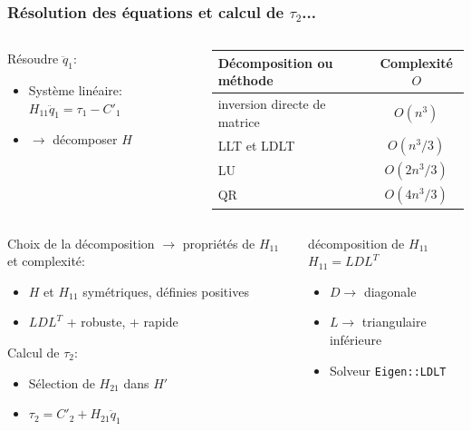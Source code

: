 \documentclass[10pt]{beamer}
\begin{document}
\begin{frame}[allowframebreaks]
  \frametitle{Résolution des équations et calcul de $\tau_2$...}
  
  \begin{columns}[T]
	\begin{column}{0.5\textwidth}
		Résoudre $\ddot{q}_1$:
		\begin{itemize}
		\item Système linéaire: $H_{11} \ddot{q}_1 = \tau_1 - C'_1$
		\item $\rightarrow$ décomposer $H$
		\end{itemize}
  \end{column}
	\begin{column}{0.5\textwidth}\scriptsize
		\begin{tabular}[H]{|l|c|}
		\hline
		Décomposition ou méthode & Complexité $O$ \\ \hline \hline
		inversion directe de matrice & $O(n^3)$ \\ \hline
		LLT et LDLT & $O(n^3/3)$ \\ \hline
		LU & $O(2n^3/3)$ \\ \hline
		QR & $O(4n^3/3)$ \\
		\hline
		\end{tabular}
	\end{column}
	\end{columns}

  \vspace{1cm}
  \begin{columns}[T]
	\begin{column}{0.55\textwidth}
		Choix de la décomposition $\rightarrow$ propriétés de $H_{11}$ et complexité:
		\begin{itemize}
		\item $H$ et $H_{11}$ symétriques, définies positives 
		\item $LDL^T$ + robuste, + rapide
		\end{itemize}
		
		\bigskip
		Calcul de $\tau_2$:
		\begin{itemize}
		\item Sélection de $H_{21}$ dans  $H'$
		\item $\tau_2 = C'_2 + H_{21} \ddot{q}_1$
		\end{itemize}
  \end{column}
	\begin{column}{0.45\textwidth}
	  \begin{alertblock}{décomposition de $H_{11}$}
    $H_{11} = L D L^T$
    \begin{itemize}
	    \item $D \longrightarrow$ diagonale
	    \item $L \longrightarrow$ triangulaire inférieure \\
	    \item Solveur \verb;Eigen::LDLT;
	  \end{itemize}
    \end{alertblock}
	\end{column}
	\end{columns} \vfill
	
\end{frame}
\end{document}
